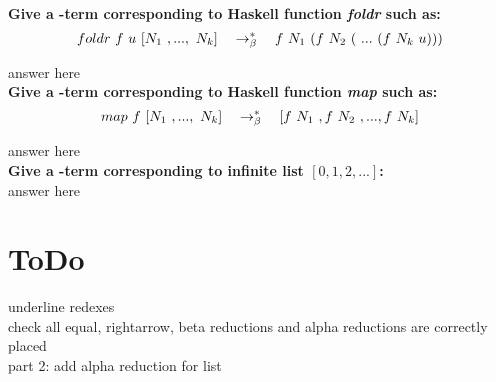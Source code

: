 \documentclass{article}
\begin{document}
	\begin{Large}
		\textbf{Give a \lamb -term corresponding to Haskell function \textit{foldr} such as:}\\
		
		\begin{equation*}
			foldr \ f \ u \ [N_1 \ ,..., \ N_k] \quad \rightarrow_\beta^*\quad f \ N_1\ (f \ N_2 \ ( \ ... \ (f \ N_k \ u)))
		\end{equation*}
		\newline
		
		answer here\\
		
		\textbf{Give a \lamb -term corresponding to Haskell function \textit{map} such as:}\\
		
		\begin{equation*}
			map \ f \ [N_1\ ,..., \ N_k] \equalsT [f \ N_1 \ , f \ N_2 \ ,...,f \ N_k]
		\end{equation*}
		\newline
		
		answer here\\
		
		\textbf{Give a \lamb -term corresponding to infinite list $[0,1,2,...]$:}\\
		
		answer here
	\end{Large}
	
	
	\newpage
	
	\section{ToDo}
	
	\begin{Large}
		underline redexes\\
		
		check all equal, rightarrow, beta reductions and alpha reductions are correctly placed\\
		
		part 2: add alpha reduction for list\\
	\end{Large}
\end{document}

